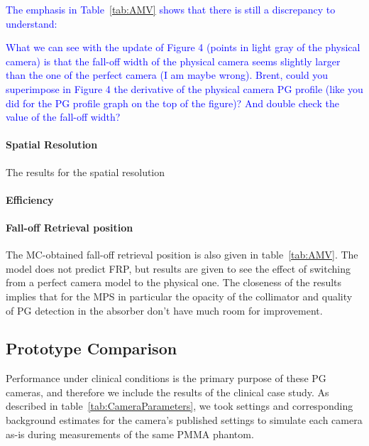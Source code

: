 \documentclass[a4paper,english,12pt]{article}
\newcommand{\et}[2][blue]{\textcolor{#1}{#2}}
\begin{document}
\et{The emphasis in Table~\ref{tab:AMV} shows that there is still a discrepancy to understand:}
	
\et{What we can see with the update of Figure 4 (points in light gray of the physical camera) is that the fall-off width of the physical camera seems slightly larger than the one of the perfect camera (I am maybe wrong). Brent, could you superimpose in Figure 4 the derivative of the physical camera PG profile (like you did for the PG profile graph on the top of the figure)? And double check the value of the fall-off width?}

\paragraph{Spatial Resolution} The results for the spatial resolution 

\paragraph{Efficiency}

\paragraph{Fall-off Retrieval position} The MC-obtained fall-off retrieval position is also given in table~\ref{tab:AMV}. The model does not predict FRP, but results are given to see the effect of switching from a perfect camera model to the physical one. The closeness of the results implies that for the MPS in particular the opacity of the collimator and quality of PG detection in the absorber don't have much room for improvement.


\subsection{Prototype Comparison}

Performance under clinical conditions is the primary purpose of these PG cameras, and therefore we include the results of the clinical case study. As described in table~\ref{tab:CameraParameters}, we took settings and corresponding background estimates for the camera's published settings to simulate each camera as-is during measurements of the same PMMA phantom.
\end{document}
